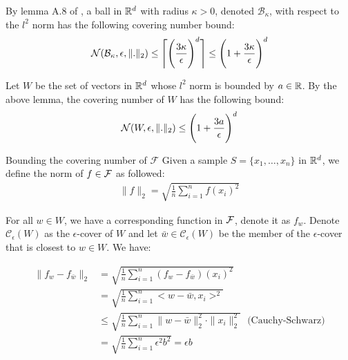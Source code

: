\begin{proof*}
    By lemma A.8 of \cite{article:long_and_sedghi}, a ball in $\mathbb{R}^d$ with radius $\kappa>0$, denoted $\mathcal{B}_\kappa$, with respect to the $l^2$ norm has the following covering number bound:
    \begin{align*}
        \mathcal{N}(\mathcal{B}_\kappa, \epsilon, \|.\|_2) \le \Bigg\lceil 
            \Bigg( \frac{3\kappa}{\epsilon} \Bigg)^d
        \Bigg\rceil \le \Bigg( 1 + \frac{3\kappa}{\epsilon} \Bigg)^d
    \end{align*}

    \noindent Let $W$ be the set of vectors in $\mathbb{R}^d$ whose $l^2$ norm is bounded by $a\in\mathbb{R}$. By the above lemma, the covering number of $W$ has the following bound:
    \begin{align*}
        \mathcal{N}(W, \epsilon, \|.\|_2) \le \Bigg( 
            1 + \frac{3a}{\epsilon}
         \Bigg)^d
    \end{align*}

    \begin{subproof}{Bounding the covering number of $\mathcal{F}$}
        Given a sample $S=\{x_1, \dots, x_n\}$ in $\mathbb{R}^d$, we define the norm of $f\in\mathcal{F}$ as followed:
        \begin{align*}
            \|f\|_2  = \sqrt{
                \frac{1}{n}\sum_{i=1}^n f(x_i)^2
            }
        \end{align*}

        \noindent For all $w\in W$, we have a corresponding function in $\mathcal{F}$, denote it as $f_w$. Denote $\mathcal{C}_\epsilon(W)$ as the $\epsilon$-cover of $W$ and let $\bar{w}\in\mathcal{C}_\epsilon(W)$ be the member of the $\epsilon$-cover that is closest to $w\in W$. We have:
        
        \begin{align*}
            \| f_w - f_{\bar{w}} \|_2 
                &= \sqrt{
                    \frac{1}{n}\sum_{i=1}^n (f_w-f_{\bar{w}})(x_i)^2
                }\\
                &= \sqrt{
                    \frac{1}{n}\sum_{i=1}^n \big<w-\bar{w}, x_i\big>^2
                } \\
                &\le \sqrt{
                    \frac{1}{n}\sum_{i=1}^n \|w-\bar{w}\|_2^2 \cdot \|x_i\|_2^2
                } \ \ \ \text{(Cauchy-Schwarz)} \\
                &= \sqrt{
                    \frac{1}{n}\sum_{i=1}^n \epsilon^2b^2
                } = \epsilon b
        \end{align*}


\end{subproof}
\end{proof*}

